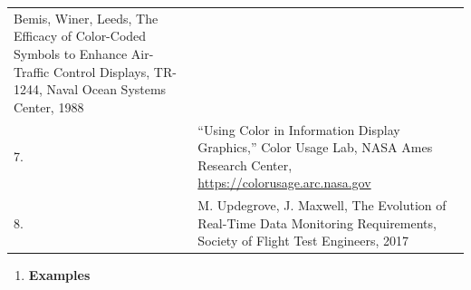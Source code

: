 \documentclass[
]{book}
\providecommand{\tightlist}{%
  \setlength{\itemsep}{0pt}\setlength{\parskip}{0pt}}
\begin{document}
\begin{longtable}[]{@{}ll@{}}
\begin{minipage}[t]{0.93\columnwidth}
Bemis, Winer, Leeds, The Efficacy of Color-Coded Symbols to Enhance Air-Traffic Control Displays, TR-1244, Naval Ocean Systems Center, 1988\strut
\end{minipage}\tabularnewline
\begin{minipage}[t]{0.01\columnwidth}\raggedright
7.\strut
\end{minipage} & \begin{minipage}[t]{0.93\columnwidth}\raggedright
``Using Color in Information Display Graphics,'' Color Usage Lab, NASA Ames Research Center, \url{https://colorusage.arc.nasa.gov}\strut
\end{minipage}\tabularnewline
\begin{minipage}[t]{0.01\columnwidth}\raggedright
8.\strut
\end{minipage} & \begin{minipage}[t]{0.93\columnwidth}\raggedright
M. Updegrove, J. Maxwell, The Evolution of Real-Time Data Monitoring Requirements, Society of Flight Test Engineers, 2017\strut
\end{minipage}\tabularnewline
\bottomrule
\end{longtable}

\begin{enumerate}
\def\labelenumi{\arabic{enumi}.}
\setcounter{enumi}{6}
\tightlist
\item
  \textbf{Examples}
\end{enumerate}
\end{document}
